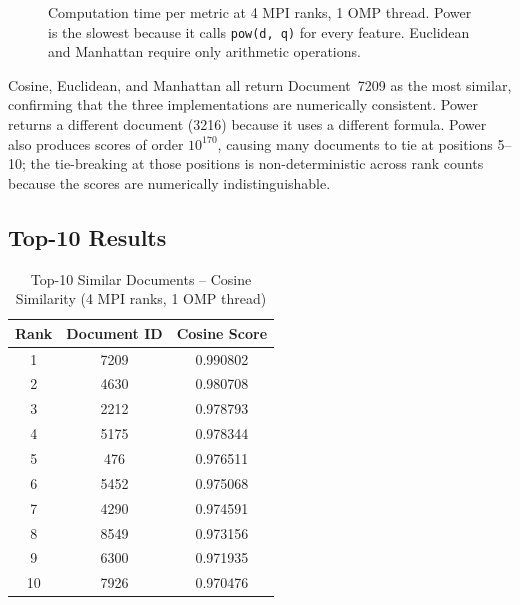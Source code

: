 \documentclass[12pt,a4paper]{article}
\begin{document}
\begin{figure}[!htbp]
\centering
{}
\caption{Computation time per metric at 4 MPI ranks, 1 OMP thread.
         Power is the slowest because it calls \texttt{pow(d,\,q)}
         for every feature. Euclidean and Manhattan require only
         arithmetic operations.}
\label{fig:metrics}
\end{figure}

Cosine, Euclidean, and Manhattan all return Document~7209 as the most
similar, confirming that the three implementations are numerically
consistent. Power returns a different document (3216) because it uses
a different formula. Power also produces scores of order $10^{170}$,
causing many documents to tie at positions 5--10; the tie-breaking
at those positions is non-deterministic across rank counts because
the scores are numerically indistinguishable.

\subsection{Top-10 Results}

\begin{table}[!htbp]
\centering
\small
\caption{Top-10 Similar Documents -- Cosine Similarity
         (4 MPI ranks, 1 OMP thread)}
\label{tab:top10}
\renewcommand{\arraystretch}{1.3}
\begin{tabular}{|c|c|c|}
\hline
\textbf{Rank} & \textbf{Document ID} & \textbf{Cosine Score} \\
\hline
1  & 7209 & 0.990802 \\
2  & 4630 & 0.980708 \\
3  & 2212 & 0.978793 \\
4  & 5175 & 0.978344 \\
5  & 476  & 0.976511 \\
6  & 5452 & 0.975068 \\
7  & 4290 & 0.974591 \\
8  & 8549 & 0.973156 \\
9  & 6300 & 0.971935 \\
10 & 7926 & 0.970476 \\
\hline
\end{tabular}
\end{table}
\end{document}
